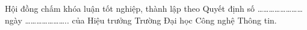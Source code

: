 
Hội đồng chấm khóa luận tốt nghiệp, thành lập theo Quyết định số …………………… ngày ………………….. của Hiệu trưởng Trường Đại học Công nghệ Thông tin.
